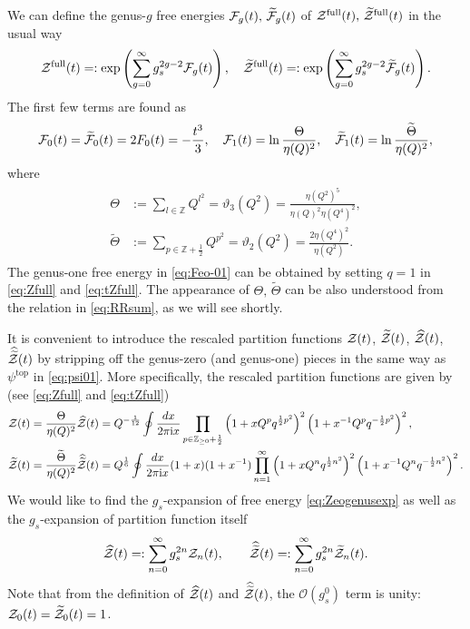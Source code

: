 \documentclass[11pt]{article}
\newcommand{\ri}{{\rm i}}
\newcommand{\hf}{\frac{1}{2}}
\def\h#1{\widehat{#1}}
\newcommand{\nn}{\nonumber}
\renewcommand{\[}{\begin{eqnarray}}
\renewcommand{\]}{\end{eqnarray}}
\newcommand{\bbZ}{{\mathbb Z}}
\newcommand{\Zefull}{{\cal Z}^{\text{full}}}
\newcommand{\Zofull}{{\widetilde{\cal Z}}^{\text{full}}}
\newcommand{\Zeven}{{\cal Z}}
\newcommand{\Zodd}{{\widetilde{\cal Z}}}
\newcommand{\Feven}{{\cal F}}
\newcommand{\Fodd}{{\widetilde{\cal F}}}
\newcommand{\Thetaeven}{\Theta}
\newcommand{\Thetaodd}{{\widetilde{\Theta}}}
\newcommand{\hh}[1]{\hspace{.2em}\widehat{\hspace{-.2em}#1}}
\begin{document}
We can define
the genus-$g$ free energies
$\Feven_g(t),\,\Fodd_g(t)$ of
$\Zefull(t),\,\Zofull(t)$ in the usual way
%
\begin{align}
\Zefull(t)=:\exp\left(\sum_{g=0}^\infty g_s^{2g-2}\Feven_g(t)\right),
\quad
\Zofull(t)=:\exp\left(\sum_{g=0}^\infty g_s^{2g-2}\Fodd_g(t)\right).
\label{eq:Zeogenusexp}
\end{align}
%
The first few terms are found as
%
\begin{align}
\begin{aligned}
\Feven_0(t)=\Fodd_0(t)=2F_0(t)=-\frac{t^3}{3},\quad
\Feven_1(t)=\ln\frac{\Thetaeven}{\eta(Q)^2},\quad
\Fodd_1(t)=\ln\frac{\Thetaodd}{\eta(Q)^2},
\end{aligned}
\label{eq:Feo-01}
\end{align}
%
where
%
\begin{align}
\begin{aligned}
\Thetaeven&:=\sum_{l\in\mathbb{Z}}Q^{l^2}=\vartheta_3(Q^2)
 =\frac{\eta(Q^2)^5}{\eta(Q)^2\eta(Q^4)^2},\\
\Thetaodd&:=\sum_{p\in\mathbb{Z}+\hf}Q^{p^2}=\vartheta_2(Q^2)
 =\frac{2\eta(Q^4)^2}{\eta(Q^2)}.
\end{aligned}
\label{eq:defTh}
\end{align}
%
The genus-one free energy in \eqref{eq:Feo-01}
can be obtained by setting $q=1$ in \eqref{eq:Zfull} and \eqref{eq:tZfull}. 
The appearance of $\Thetaeven,\,\Thetaodd$
can be also understood from the relation
 in \eqref{eq:RRsum},
as we will see shortly.


It is convenient to introduce
the rescaled partition functions
$\Zeven(t)$, $\Zodd(t)$, $\h{\Zeven}(t)$, $\hh{\Zodd}(t)$ by
stripping off the genus-zero (and genus-one) pieces
in the same way as $\psi^{\text{top}}$ in \eqref{eq:psi01}.
More specifically, the rescaled partition functions are given by
(see \eqref{eq:Zfull} and \eqref{eq:tZfull})
%
\begin{align}
\Zeven(t) &= \frac{\Thetaeven}{\eta(Q)^2}\h{\Zeven}(t) =
 Q^{-\frac{1}{12}}
 \oint\frac{dx}{2\pi\ri x}
 \prod_{p\in\bbZ_{\ge 0}+\frac{1}{2}}
 \left(1+xQ^p q^{\hf p^2}\right)^2
 \left(1+x^{-1}Q^pq^{-\hf p^2}\right)^2,\nn\\
\Zodd(t) &= \frac{\Thetaodd}{\eta(Q)^2}\hh{\Zodd}(t) =
 Q^{\frac{1}{6}}\oint\frac{dx}{2\pi\ri x}
 (1+x)(1+x^{-1})
 \prod_{n=1}^\infty
 \left(1+xQ^n q^{\hf n^2}\right)^2
 \left(1+x^{-1}Q^n q^{-\hf n^2}\right)^2.
\label{eq:Z-tZ}
\end{align}
%
We would like to find the $g_s$-expansion of free energy \eqref{eq:Zeogenusexp}
as well as the $g_s$-expansion of partition function itself
%
\begin{align}
\h{\Zeven}(t)=:\sum_{n=0}^\infty g_s^{2n}\Zeven_n(t),\qquad
\hh{\Zodd}(t)=:\sum_{n=0}^\infty g_s^{2n}\Zodd_n(t).
\label{eq:Zn-exp}
\end{align}
Note that from the definition of $\h{\Zeven}(t)$
and $\hh{\Zodd}(t)$, the $\mathcal{O}(g_s^0)$ term is unity:
$\Zeven_0(t)=\Zodd_0(t)=1$.
%
\end{document}
